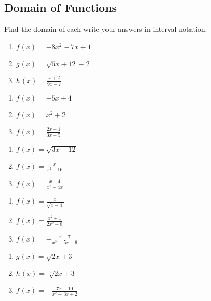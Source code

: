 \subsection*{Domain of Functions}

Find the domain of each write your answers in interval notation.
\begin{multicols}{3}
\begin{enumerate}
	\item $f(x) = -8x^2 - 7x + 1$
	\item $g(x) = \sqrt{5x+12}-2$
	\item $h(x) = \frac{x+2}{9x-7}$
\end{enumerate}	\setcounter{Review}{\value{enumi}}
\end{multicols}
\begin{multicols}{3}
\begin{enumerate}	\setcounter{enumi}{\value{Review}}
	\item $f(x) = -5x + 4$
	\item $f(x) = x^2 + 2$
	\item $f(x) = \frac{2x+1}{3x-5}$
\end{enumerate}	\setcounter{Review}{\value{enumi}}
\end{multicols}
\begin{multicols}{3}
\begin{enumerate}	\setcounter{enumi}{\value{Review}}
	\item $f(x) = \sqrt{3x-12}$
	\item $f(x) = \frac{x}{x^2-16}$
	\item $f(x) = \frac{x+4}{x^3-4x}$
\end{enumerate}	\setcounter{Review}{\value{enumi}}
\end{multicols}
\begin{multicols}{3}
\begin{enumerate}	\setcounter{enumi}{\value{Review}}
	\item $f(x) = \frac{x}{\sqrt{x-4}}$
	\item $f(x) = \frac{x^2+1}{2x^2+8}$
	\item $f(x) = -\frac{x+7}{x^2-5x-6}$
\end{enumerate}	\setcounter{Review}{\value{enumi}}
\end{multicols}
\begin{multicols}{3}
\begin{enumerate}	\setcounter{enumi}{\value{Review}}
	\item $g(x) = \sqrt{2x+3}$
	\item $h(x) = \sqrt[3]{2x+3}$
	\item $f(x) = -\frac{7x-10}{x^2+3x+2}$
\end{enumerate}	\setcounter{Review}{\value{enumi}}
\end{multicols}
